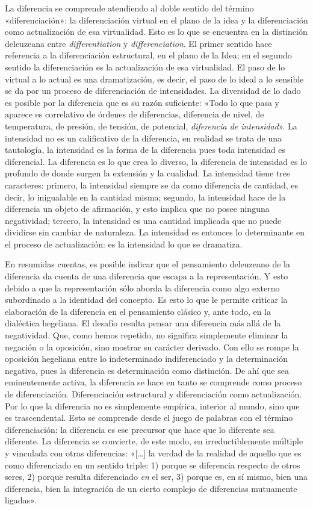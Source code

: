 La diferencia se comprende atendiendo al doble sentido del término «diferenciación»: la diferenciación virtual en el plano de la idea y la diferenciación como actualización de esa virtualidad. Esto es lo que se encuentra en la distinción deleuzeana entre \emph{differentiation} y \emph{differenciation}. El primer sentido hace referencia a la diferenciación estructural, en el plano de la Idea; en el segundo sentido la diferenciación es la actualización de esa virtualidad. El paso de lo virtual a lo actual es una dramatización, es decir, el paso de lo ideal a lo sensible se da por un proceso de diferenciación de intensidades. La diversidad de lo dado es posible por la diferencia que es su razón suficiente: «Todo lo que pasa y aparece es correlativo de órdenes de diferencias, diferencia de nivel, de temperatura, de presión, de tensión, de potencial, \emph{diferencia de intensidad}». La intensidad no es un calificativo de la diferencia, en realidad se trata de una tautología, la intensidad es la forma de la diferencia pues toda intensidad es diferencial. La diferencia es lo que crea lo diverso, la diferencia de intensidad es lo profundo de donde surgen la extensión y la cualidad. La intensidad tiene tres caracteres: primero, la intensidad siempre se da como diferencia de cantidad, es decir, lo inigualable en la cantidad misma; segundo, la intensidad hace de la diferencia un objeto de afirmación, y esto implica que no posee ninguna negatividad; tercero, la intensidad es una cantidad implicada que no puede dividirse sin cambiar de naturaleza. La intensidad es entonces lo determinante en el proceso de actualización: es la intensidad lo que se dramatiza.

En resumidas cuentas, es posible indicar que el pensamiento deleuzeano de la diferencia da cuenta de una diferencia que escapa a la representación. Y esto debido a que la representación sólo aborda la diferencia como algo externo subordinado a la identidad del concepto. Es esto lo que le permite criticar la elaboración de la diferencia en el pensamiento clásico y, ante todo, en la dialéctica hegeliana. El desafío resulta pensar una diferencia más allá de la negatividad. Que, como hemos repetido, no significa simplemente eliminar la negación o la oposición, sino mostrar su carácter derivado. Con ello se rompe la oposición hegeliana entre lo indeterminado indiferenciado y la determinación negativa, pues la diferencia es determinación como distinción. De ahí que sea eminentemente activa, la diferencia se hace en tanto se comprende como proceso de diferenciación. Diferenciación estructural y diferenciación como actualización. Por lo que la diferencia no es simplemente empírica, interior al mundo, sino que es trascendental. Esto se comprende desde el juego de palabras con el término diferenciación: la diferencia es ese precursor que hace que lo diferente sea diferente. La diferencia se convierte, de este modo, en irreductiblemente múltiple y vinculada con otras diferencias: «{[}\ldots{]} la verdad de la realidad de aquello que es como diferenciado en un sentido triple: 1) porque se diferencia respecto de otros seres, 2) porque resulta diferenciado \emph{en }el ser, 3) porque es, en sí mismo, bien una diferencia, bien la integración de un cierto complejo de diferencias mutuamente ligadas».

